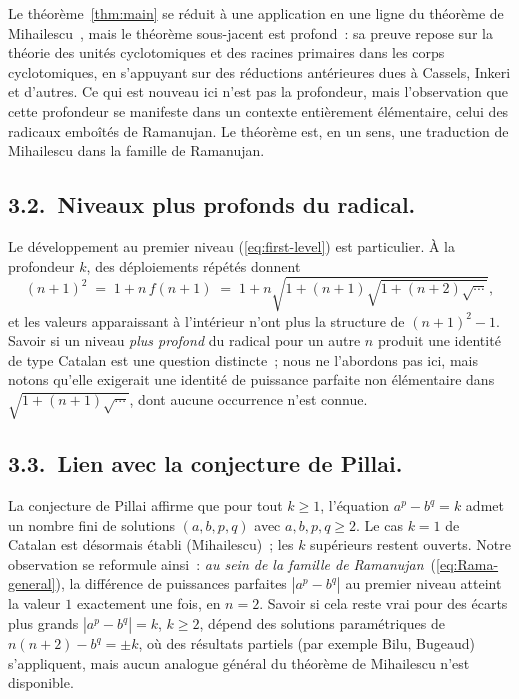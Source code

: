 \documentclass[12pt,a4paper]{article}
\begin{document}
Le théorème~\ref{thm:main} se réduit à une application en une ligne du
théorème de Mihailescu~\cite{Mihailescu2004}, mais le théorème sous-jacent
est profond~: sa preuve repose sur la théorie des unités cyclotomiques et
des racines primaires dans les corps cyclotomiques, en s'appuyant sur des
réductions antérieures dues à Cassels, Inkeri et d'autres. Ce qui est
nouveau ici n'est pas la profondeur, mais l'observation que cette
profondeur se manifeste dans un contexte entièrement élémentaire, celui
des radicaux emboîtés de Ramanujan. Le théorème est, en un sens, une
traduction de Mihailescu dans la famille de Ramanujan.

\subsection*{3.2.\ Niveaux plus profonds du radical.}

Le développement au premier niveau (\ref{eq:first-level}) est particulier.
À la profondeur $k$, des déploiements répétés donnent
\[
(n+1)^2 \;=\; 1 + n \, f(n+1)
\;=\; 1 + n\sqrt{1 + (n+1)\sqrt{1 + (n+2)\sqrt{\cdots}}},
\]
et les valeurs apparaissant à l'intérieur n'ont plus la structure de
$(n+1)^2 - 1$. Savoir si un niveau \emph{plus profond} du radical pour un
autre $n$ produit une identité de type Catalan est une question distincte~;
nous ne l'abordons pas ici, mais notons qu'elle exigerait une identité de
puissance parfaite non élémentaire dans
$\sqrt{1 + (n+1)\sqrt{\cdots}}$, dont aucune occurrence n'est connue.

\subsection*{3.3.\ Lien avec la conjecture de Pillai.}

La conjecture de Pillai affirme que pour tout $k \geq 1$, l'équation
$a^p - b^q = k$ admet un nombre fini de solutions $(a, b, p, q)$ avec
$a, b, p, q \geq 2$. Le cas $k = 1$ de Catalan est désormais établi
(Mihailescu)~; les $k$ supérieurs restent ouverts. Notre observation se
reformule ainsi~: \emph{au sein de la famille de Ramanujan}~(\ref{eq:Rama-general}),
la différence de puissances parfaites $|a^p - b^q|$ au premier niveau
atteint la valeur $1$ exactement une fois, en $n = 2$. Savoir si cela
reste vrai pour des écarts plus grands $|a^p - b^q| = k$, $k \geq 2$,
dépend des solutions paramétriques de $n(n+2) - b^q = \pm k$, où des
résultats partiels (par exemple Bilu, Bugeaud) s'appliquent, mais aucun
analogue général du théorème de Mihailescu n'est disponible.
\end{document}
